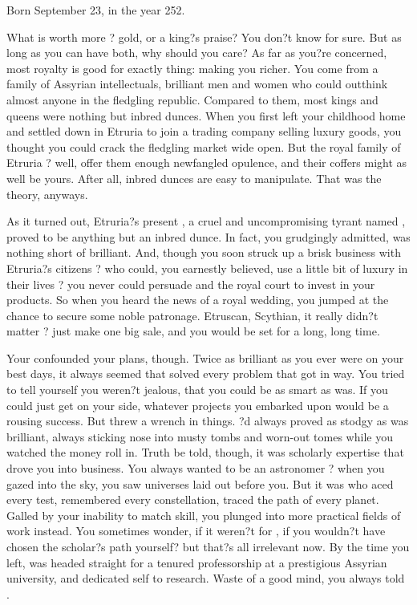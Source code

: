 \documentclass[char]{Kos}
\begin{document}
\name{\cMerchant{}}

Born September 23, in the year 252.

What is worth more ? gold, or a king?s praise? You don?t know for sure. But as long as you can have both, why should you care? As far as you?re concerned, most royalty is good for exactly thing: making you richer. You come from a family of Assyrian intellectuals, brilliant men and women who could outthink almost anyone in the fledgling republic. Compared to them, most kings and queens were nothing but inbred dunces. When you first left your childhood home and settled down in Etruria to join a trading company selling luxury goods, you thought you could crack the fledgling market wide open. But the royal family of Etruria ? well, offer them enough newfangled opulence, and their coffers might as well be yours. After all, inbred dunces are easy to manipulate. That was the theory, anyways. 

As it turned out, Etruria?s present \cEtruriaKing{\monarch}, a cruel and uncompromising tyrant named \cEtruriaKing{}, proved to be anything but an inbred dunce. In fact, you grudgingly admitted, \cEtruriaKing{\they} was nothing short of brilliant. And, though you soon struck up a brisk business with Etruria?s citizens ? who could, you earnestly believed, use a little bit of luxury in their lives ? you never could persuade \cEtruriaKing{} and the royal court to invest in your products. So when you heard the news of a royal wedding, you jumped at the chance to secure some noble patronage. Etruscan, Scythian, it really didn?t matter ? just make one big sale, and you would be set for a long, long time.

Your \cAnarchist{\sibling} \cAnarchist{} confounded your plans, though. Twice as brilliant as you ever were on your best days, it always seemed that \cAnarchist{\they} solved every problem that got in \cAnarchist{\their} way. You tried to tell yourself you weren?t jealous, that you could be as smart as \cAnarchist{\they} was. If you could just get \cAnarchist{\them} on your side, whatever projects you embarked upon would be a rousing success. But \cAnarchist{\they} threw a wrench in things. \cAnarchist{\they}?d always proved as stodgy as \cAnarchist{\they} was brilliant, always sticking \cAnarchist{\their} nose into musty tombs and worn-out tomes while you watched the money roll in. Truth be told, though, it was \cAnarchist{\their} scholarly expertise that drove you into business. You always wanted to be an astronomer ? when you gazed into the sky, you saw universes laid out before you. But it was \cAnarchist{} who aced every test, remembered every constellation, traced the path of every planet. Galled by your inability to match \cAnarchist{\their} skill, you plunged into more practical fields of work instead. You sometimes wonder, if it weren?t for \cAnarchist{\nickname}, if you wouldn?t have chosen the scholar?s path yourself? but that?s all irrelevant now. By the time you left, \cAnarchist{\they} was headed straight for a tenured professorship at a prestigious Assyrian university, and dedicated \cAnarchist{\them}self to research. Waste of a good mind, you always told \cAnarchist{\them}.
\end{document}
